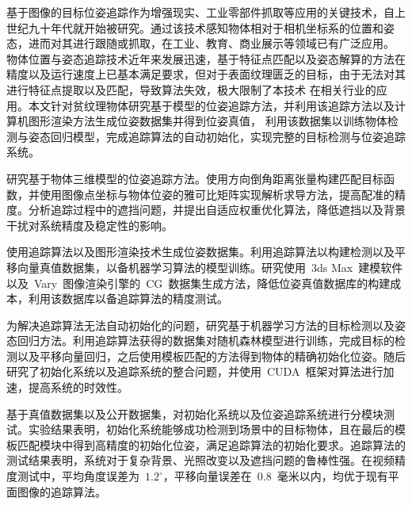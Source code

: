\begin{cabstract}  
  基于图像的目标位姿追踪作为增强现实、工业零部件抓取等应用的关键技术，自上世纪九十年代就开始被研究。通过该技术感知物体相对于相机坐标系的位置和姿态，进而对其进行跟随或抓取，在工业、教育、商业展示等领域已有广泛应用。
  物体位置与姿态追踪技术近年来发展迅速，基于特征点匹配以及姿态解算的方法在精度以及运行速度上已基本满足要求，但对于表面纹理匮乏的目标，由于无法对其进行特征点提取以及匹配，导致算法失效，极大限制了本技术
  在相关行业的应用。本文针对贫纹理物体研究基于模型的位姿追踪方法，并利用该追踪方法以及计算机图形渲染方法生成位姿数据集并得到位姿真值，
  利用该数据集以训练物体检测与姿态回归模型，完成追踪算法的自动初始化，实现完整的目标检测与位姿追踪系统。


  研究基于物体三维模型的位姿追踪方法。使用方向倒角距离张量构建匹配目标函数，并使用图像点坐标与物体位姿的雅可比矩阵实现解析求导方法，提高配准的精度。分析追踪过程中的遮挡问题，并提出自适应权重优化算法，降低遮挡以及背景干扰对系统精度及稳定性的影响。

  使用追踪算法以及图形渲染技术生成位姿数据集。利用追踪算法以构建检测以及平移向量真值数据集，以备机器学习算法的模型训练。研究使用~3ds Max~建模软件以及~Vary~图像渲染引擎的~CG~数据集生成方法，降低位姿真值数据库的构建成本，利用该数据库以备追踪算法的精度测试。

  为解决追踪算法无法自动初始化的问题，研究基于机器学习方法的目标检测以及姿态回归方法。利用追踪算法获得的数据集对随机森林模型进行训练，完成目标的检测以及平移向量回归，之后使用模板匹配的方法得到物体的精确初始化位姿。随后研究了初始化系统以及追踪系统的整合问题，并使用~CUDA~框架对算法进行加速，提高系统的时效性。
  
  基于真值数据集以及公开数据集，对初始化系统以及位姿追踪系统进行分模块测试。实验结果表明，初始化系统能够成功检测到场景中的目标物体，且在最后的模板匹配模块中得到高精度的初始化位姿，满足追踪算法的初始化要求。追踪算法的测试结果表明，系统对于复杂背景、光照改变以及遮挡问题的鲁棒性强。在视频精度测试中，平均角度误差为~$1.2^\circ$，平移向量误差在~0.8~毫米以内，均优于现有平面图像的追踪算法。
\end{cabstract}


